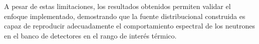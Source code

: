 \begin{itemize}
\end{itemize}

A pesar de estas limitaciones, los resultados obtenidos permiten validar el enfoque implementado, demostrando que la fuente distribucional construida es capaz de reproducir adecuadamente el comportamiento espectral de los neutrones en el banco de detectores en el rango de interés térmico.
